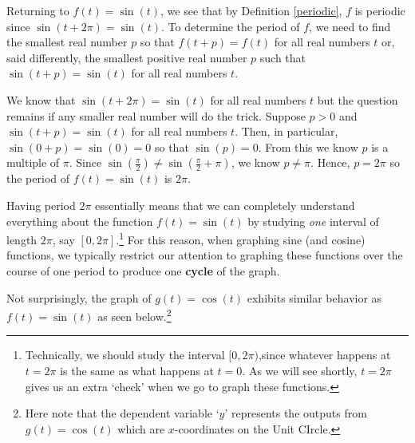 \documentclass{ximera}
\begin{document}
\smallskip

Returning to $f(t) = \sin(t)$, we see that by Definition \ref{periodic}, $f$ is periodic since $\sin(t + 2\pi) = \sin(t)$.  To determine the period of $f$, we need to find the smallest real number $p$ so that $f(t+p) = f(t)$ for all real numbers $t$ or, said differently, the smallest positive real number $p$ such that $\sin(t+p) = \sin(t)$  for all real numbers $t$.  

\smallskip

We know that $\sin(t + 2\pi) = \sin(t)$ for all real numbers $t$ but the question remains if any smaller real number will do the trick.  Suppose $p>0$ and $\sin(t + p) = \sin(t)$ for all real numbers $t$.  Then, in particular, $\sin(0+p) = \sin(0)=0$ so that $\sin(p) = 0$.  From this we know $p$ is a multiple of $\pi$.  Since $\sin\left(\frac{\pi}{2} \right)  \neq \sin\left(\frac{\pi}{2} + \pi \right) $, we know $p \neq \pi$.  Hence, $p  = 2\pi$ so the period of $f(t) = \sin(t)$ is $2\pi$. 

\smallskip

Having period $2\pi$ essentially means that we can completely understand everything about the function  $f(t) =  \sin(t)$ by studying \textit{one} interval of length $2\pi$, say $[0,2\pi]$.\footnote{Technically, we should study the interval $[0,2\pi)$,\footnotemark since whatever happens at $t=2\pi$ is the same as what happens at $t=0$.  As we will see shortly, $t=2\pi$ gives us an extra `check' when we go to graph these functions.} \footnotetext{In some advanced texts, the interval of choice is $[-\pi, \pi)$.}  For this reason, when graphing sine (and cosine) functions, we typically restrict our attention to graphing these functions over the course of one period to produce one \textbf{cycle} of the graph. 
 
\smallskip


Not surprisingly, the graph of $g(t) = \cos(t)$ exhibits similar behavior as $f(t) = \sin(t)$ as seen below.\footnote{Here note that the dependent variable `$y$' represents the outputs from  $g(t) = \cos(t)$ which are $x$-coordinates on the Unit CIrcle.}  
\end{document}
